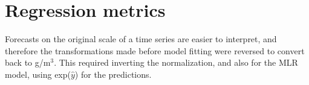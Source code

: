 
\section{Regression metrics}
Forecasts on the original scale of a time series are easier to interpret, and therefore the transformations made before model fitting were reversed to convert back to \textmugreek g/m$^3$. This required inverting the normalization, and also for the MLR model, using exp($\hat{y}$) for the predictions. 





 
